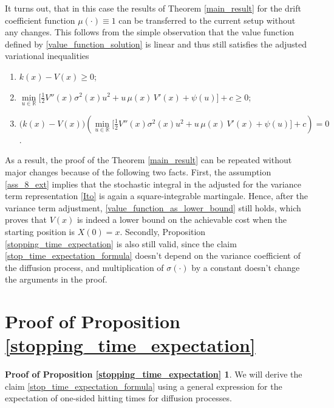 \documentclass[11pt,tbtags,reqno]{article}
\theoremstyle{definition}
\numberwithin{equation}{section}
\theoremstyle{definition}
\newtheorem*{proof_prop_2}{Proof of Proposition \ref{stopping_time_expectation}}
\begin{document}
\begin{appendices}
It turns out, that in this case the results of Theorem \ref{main_result} for the drift coefficient function $\mu(\cdot) \equiv 1$ can be transferred to the current setup without any changes. This follows from the simple observation that the value function defined by \eqref{value_function_solution} is linear and thus still satisfies the adjusted variational inequalities 
\begin{enumerate}[label = \textbf{(\roman*)$'$}]
    \item $k(x) - V(x) \ge 0$; \label{var_ineq_1_ext}
    \item $\min\limits_{u \in \mathbb{R}}\Big[\frac{1}{2}V''(x)\sigma^2(x)u^2 + u \,\mu(x)\, V'(x) + \psi(u) \Big] + c \ge 0$; \label{var_ineq_2_ext}
    \item $\Big( k(x) - V(x)\Big)\left( \min\limits_{u \in \mathbb{R}}\Big[\frac{1}{2}V''(x)\sigma^2(x)u^2 + u \,\mu(x)\, V'(x) + \psi(u) \Big] + c
    \right) = 0$. \label{var_ineq_3_ext}
\end{enumerate}
As a result, the proof of the Theorem \ref{main_result} can be repeated without major changes because of the following two facts. First, the assumption \ref{ass_8_ext} implies that the stochastic integral in the adjusted for the variance term representation \eqref{Ito} is again a square-integrable martingale. Hence, after the variance term adjustment, \eqref{value_function_as_lower_bound} still holds, which proves that $V(x)$ is indeed a lower bound on the achievable cost when the starting position is $X(0) = x$. Secondly, Proposition \ref{stopping_time_expectation} is also still valid, since the claim \eqref{stop_time_expectation_formula} doesn't depend on the variance coefficient of the diffusion process, and multiplication of $\sigma(\cdot)$ by a constant doesn't change the arguments in the proof.

\section{Proof of Proposition \ref{stopping_time_expectation}}\label{appendix_proof}

\begin{proof_prop_2}
We will derive the claim  \eqref{stop_time_expectation_formula} using a general expression for the expectation of one-sided hitting times for diffusion processes. 


\end{proof_prop_2}
\end{appendices}
\end{document}
